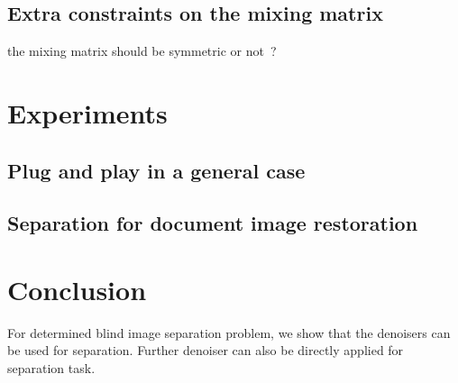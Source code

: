 \documentclass[conference]{IEEEtran}
\theoremstyle{plain}
\begin{document}
\subsection{Extra constraints on the mixing matrix}
 the mixing matrix should be symmetric or not~\cite{tonazzini2007fast}?


\section{Experiments}
\label{sec: xp}


\subsection{Plug and play in a general case}

 
 
\subsection{Separation for document image restoration}



\section{Conclusion}
\label{sec: conclusion}
For determined blind image separation problem, we show that the denoisers can be used for separation. Further denoiser can also be directly applied for separation task.

\newpage



\end{document}
